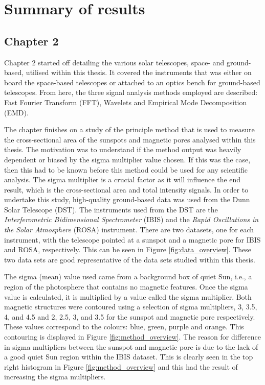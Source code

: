 \section{Summary of results}

	\subsection{Chapter 2}

    Chapter 2 started off detailing the various solar telescopes, space- and ground-based, utilised within this thesis.
    It covered the instruments that was either on board the space-based telescopes or attached to an optics bench for ground-based telescopes.
    From here, the three signal analysis methods employed are described: Fast Fourier Transform (FFT), Wavelets and Empirical Mode Decomposition (EMD).
    
    The chapter finishes on a study of the principle method that is used to measure the cross-sectional area of the sunspots and magnetic pores analysed within this thesis.
    The motivation was to understand if the method output was heavily dependent or biased by the sigma multiplier value chosen.
    If this was the case, then this had to be known before this method could be used for any scientific analysis.    
    The sigma multiplier is a crucial factor as it will influence the end result, which is the cross-sectional area and total intensity signals.
    In order to undertake this study, high-quality ground-based data was used from the Dunn Solar Telescope (DST).
    The instruments used from the DST are the \textit{Interferometric Bidimensional Spectrometer} (IBIS) and the \textit{Rapid Oscillations in the Solar Atmosphere} (ROSA) instrument.
    There are two datasets, one for each instrument, with the telescope pointed at a sunspot and a magnetic pore for IBIS and ROSA, respectively.
    This can be seen in Figure \ref{fig:data_overview}.
    These two data sets are good representative of the data sets studied within this thesis.
    
    The sigma (mean) value used came from a background box of quiet Sun, i.e., a region of the photosphere that contains no magnetic features.
    Once the sigma value is calculated, it is multiplied by a value
    called the sigma multiplier.  
    Both magnetic structures were contoured using a selection of sigma multipliers, 3, 3.5, 4, and 4.5 and 2, 2.5, 3, and 3.5 for the sunspot and magnetic pore respectively.
    These values correspond to the colours: blue, green, purple and orange.
    This contouring is displayed in Figure \ref{fig:method_overview}.
    The reason for difference in sigma multipliers between the sunspot and magnetic pore is due to the lack of a good quiet Sun region within the IBIS dataset.
    This is clearly seen in the top right histogram in Figure \ref{fig:method_overview} and this had the result of increasing the sigma multipliers.
    
